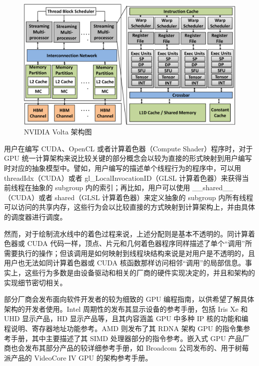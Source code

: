 \begin{figure}
    \centering
    \includegraphics[width=1.0\linewidth]{figures/Volta_archi-crop.pdf}
    \caption{NVIDIA Volta 架构图\cite{9138922}}
    \label{fig:volta_arch}
\end{figure}

用户在编写 CUDA、OpenCL 或者计算着色器（Compute Shader）程序时，对于 GPU 统一计算架构来说比较关键的部分概念会以较为直接的形式映射到用户编写时对应的抽象模型中。譬如，用户编写的描述单个线程行为的程序中，可以用 threadIdx（CUDA）或者 gl\_LocalInvocationID（GLSL 计算着色器）来获得当前线程在抽象的 subgroup 内的索引；再比如，用户可以使用 \_\_shared\_\_（CUDA）或者 shared（GLSL 计算着色器）来定义抽象的 subgroup 内所有线程可以访问的共享内存，这些行为会以比较直接的方式映射到计算架构上，并由具体的调度器进行调度。

然而，对于绘制流水线中的着色过程来说，上述分配则是基本不透明的。同计算着色器或 CUDA 代码一样，顶点、片元和几何着色器程序同样描述了单个“调用”所需要执行的操作；但该调用是如何映射到线程块结构来说是对用户是不透明的，且用户也无法如同计算着色器或 CUDA 核函数那样访问相邻“调用”的局部信息。事实上，这些行为多数是由设备驱动和相关的厂商的硬件实现决定的，并且和架构的实现细节密切相关。


部分厂商会发布面向软件开发者的较为细致的 GPU 编程指南，以供希望了解具体架构的开发者使用。Intel 周期性的发布其显示设备的参考手册，包括 Iris Xe 和 UHD 显示产品，HD 显示产品等\cite{IntelGPUManual}，且其内容涵盖 GPU 中多种 IP 核的功能和编程说明、寄存器地址功能参考。AMD 则发布了其 RDNA 架构 GPU 的指令集参考手册\cite{AMDRDNAISA}，其中主要描述了其 SIMD 处理器部分的指令参考。嵌入式 GPU 产品厂商也会发布其部分产品的较详细参考手册，如 Broadcom 公司发布的、用于树莓派产品的 VideoCore IV GPU 的架构参考手册\cite{V3DManual}。

